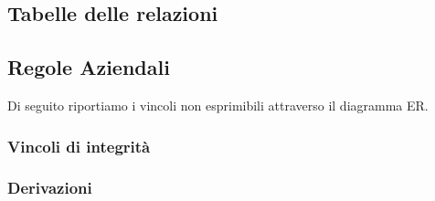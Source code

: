 \subsection{Tabelle delle relazioni}

\subsection{Regole Aziendali}
Di seguito riportiamo i vincoli non esprimibili attraverso il diagramma ER.
\subsubsection{Vincoli di integrità}
\subsubsection{Derivazioni}